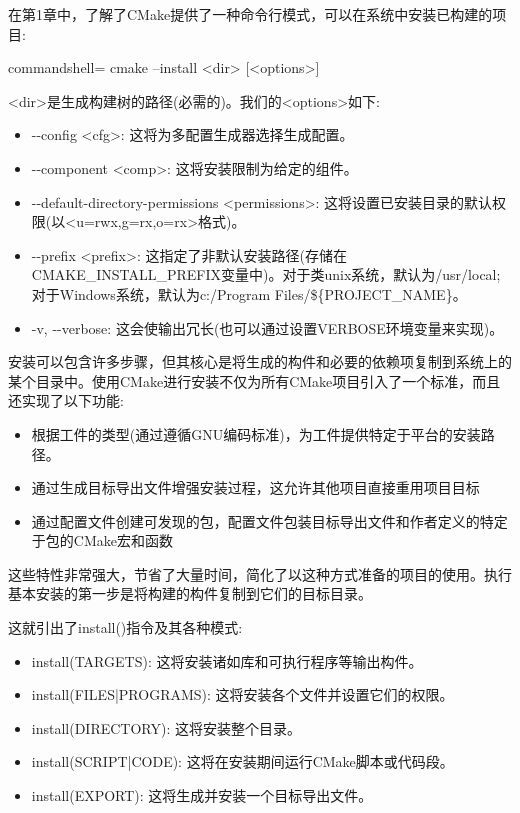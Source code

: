 
在第1章中，了解了CMake提供了一种命令行模式，可以在系统中安装已构建的项目:

\begin{tcblisting}{commandshell={}}
cmake --install <dir> [<options>]
\end{tcblisting}

<dir>是生成构建树的路径(必需的)。我们的<options>如下:

\begin{itemize}
\item 
-{}-config <cfg>: 这将为多配置生成器选择生成配置。

\item 
-{}-component <comp>: 这将安装限制为给定的组件。

\item 
-{}-default-directory-permissions <permissions>: 这将设置已安装目录的默认权限(以<u=rwx,g=rx,o=rx>格式)。

\item 
-{}-prefix <prefix>: 这指定了非默认安装路径(存储在CMAKE\_INSTALL\_PREFIX变量中)。对于类unix系统，默认为/usr/local;对于Windows系统，默认为c:/Program Files/\$\{PROJECT\_NAME\}。

\item 
-v, -{}-verbose: 这会使输出冗长(也可以通过设置VERBOSE环境变量来实现)。
\end{itemize}

安装可以包含许多步骤，但其核心是将生成的构件和必要的依赖项复制到系统上的某个目录中。使用CMake进行安装不仅为所有CMake项目引入了一个标准，而且还实现了以下功能:

\begin{itemize}
\item 
根据工件的类型(通过遵循GNU编码标准)，为工件提供特定于平台的安装路径。

\item 
通过生成目标导出文件增强安装过程，这允许其他项目直接重用项目目标

\item 
通过配置文件创建可发现的包，配置文件包装目标导出文件和作者定义的特定于包的CMake宏和函数
\end{itemize}

这些特性非常强大，节省了大量时间，简化了以这种方式准备的项目的使用。执行基本安装的第一步是将构建的构件复制到它们的目标目录。

这就引出了install()指令及其各种模式:

\begin{itemize}
\item 
install(TARGETS): 这将安装诸如库和可执行程序等输出构件。

\item 
install(FILES|PROGRAMS): 这将安装各个文件并设置它们的权限。

\item 
install(DIRECTORY): 这将安装整个目录。

\item 
install(SCRIPT|CODE): 这将在安装期间运行CMake脚本或代码段。

\item 
install(EXPORT): 这将生成并安装一个目标导出文件。
\end{itemize}

